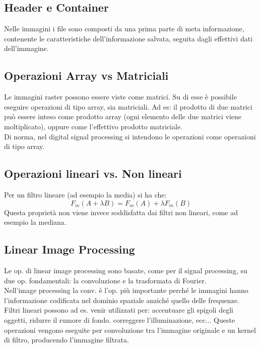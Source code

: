 \documentclass[8pt,a4paper]{article}
\begin{document}
\begin{multicols}{5}
    \subsection{Header e Container}
    Nelle immagini i file sono composti da una prima parte di meta informazione, 
    contenente le caratteristiche dell’informazione salvata, seguita dagli effettivi 
    dati dell’immagine.


    \subsection{Operazioni Array vs Matriciali}
    Le immagini raster possono essere viste come matrici. Su di esse è possibile
    eseguire operazioni di tipo array, sia matriciali. Ad es: il prodotto di due
    matrici può essere inteso come prodotto array (ogni elemento delle due matrici viene
    moltiplicato), oppure come l'effettivo prodotto matriciale.\\
    Di norma, nel digital signal processing si intendono le operazioni come
    operazioni di tipo array.

    \subsection{Operazioni lineari vs. Non lineari}
    Per un filtro lineare (ad esempio la media) si ha che:
    \begin{equation*}
      F_m (A + \lambda B) = F_m(A) + \lambda F_m(B)
    \end{equation*}
    Questa proprietà non viene invece soddisfatta dai filtri non lineari, come ad
    esempio la mediana.

    \subsection{Linear Image Processing}
    Le op. di linear image processing sono basate, come per il signal processing,
    su due op. fondamentali: la convoluzione e la trasformata di Fourier.\\
    Nell'image processing la conv. è l'op. più importante perché le immagini hanno
    l'informazione codificata nel dominio spaziale anziché quello delle frequenze.\\
    Filtri lineari possono ad es. venir utilizzati per:
    accentuare gli spigoli degli oggetti, ridurre il rumore di fondo.
    correggere l'illuminazione, ecc...
    Queste operazioni vengono eseguite per convoluzione tra l'immagine originale
    e un kernel di filtro, producendo l'immagine filtrata.


\end{multicols}
\end{document}
